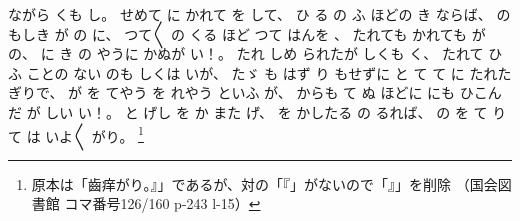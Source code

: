 ながら
くも
し。
%
せめて
に
かれて%
を
して、
%
ひ
る
の
ふ
ほどの
き
ならば、
%
の
もしき
が
の
に、
%
つて〳〵
の
くる
ほど
つて
はんを
、
%
%
たれても
かれても%
が
の、%
%
に
き
の
やうに
かぬが
い！。
%
たれ
しめ
られたが
しくも
く、
%
たれて
ひ
ふ
ことの
ない
のも
しくは
いが、
%
たゞ%
も
はず
り
もせずに
と
て
て
に
たれた
ぎりで、
%
が
を
てやう
を
れやう
といふ
が、%
%
からも
て
ぬ
ほどに
にも
%
ひこんだ
が
しい
い！。
%
と
げし
を
か
また
げ、
%
を
かしたる
の
るれば、
%
の
を
て
りて
は
いよ〳〵
がり。
\footnote{原本は「齒痒がり。』」であるが、対の「『」がないので「』」を削除
（国会図書館 コマ番号126/160 p-243 l-15）}%

